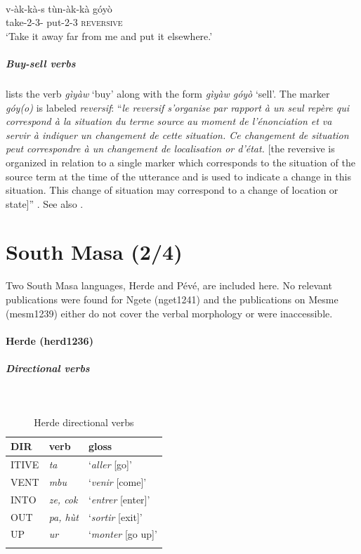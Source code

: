\ex\label{ex2:masa10}
 \\
\gll v-àk-kà-s tùn-àk-kà góyò	\\
take-2-3- put-2-3 \textsc{reversive}	\\
\glt `Take it away far from me and put it elsewhere.' 
\z 	

\subparagraph{Buy-sell verbs}

\citet[162, cf. 176]{melisDictionnaireMasafrancaisDialectes2006} lists the verb \textit{gìyàw} `buy' along with the form \textit{gìyàw góyò} `sell'. The marker \textit{góy(o)} is labeled \textit{reversif}: ``\textit{le reversif s'organise par rapport à un seul repère qui correspond à la situation du terme source au moment de l'énonciation et va servir à indiquer un changement de cette situation. Ce changement de situation peut correspondre à un changement de localisation or d'état.} [the reversive is organized in relation to a single marker which corresponds to the situation of the source term at the time of the utterance and is used to indicate a change in this situation. This change of situation may correspond to a change of location or state]'' \citep[168]{melisDictionnaireMasafrancaisDialectes2006}. See also \citet[224]{melisDescriptionMasaTchad1999}.

\section{South Masa (2/4)}

Two South Masa languages, Herde and Pévé, are included here. No relevant publications were found for Ngete (nget1241) and the publications on Mesme (mesm1239) either do not cover the verbal morphology or were inaccessible.

\paragraph*{Herde (herd1236)} \label{herd}

\subparagraph{Directional verbs}~

\begin{table}[H]
	\caption{Herde directional verbs} 
	\label{tab:herdV}
	\begin{tabular}{lll} %
		\lsptoprule
		DIR & verb & gloss   \\ %
		\midrule
		ITIVE & \textit{ta} & `\textit{aller} [go]' \\
		VENT & \textit{mbu} & `\textit{venir} [come]' \\
		INTO& \textit{ze, cok} & `\textit{entrer} [enter]' \\
		OUT & \textit{pa, hùt} & `\textit{sortir} [exit]' \\
		UP & \textit{ur} & `\textit{monter} [go up]' \\
		\lspbottomrule
	\end{tabular}
\end{table}

